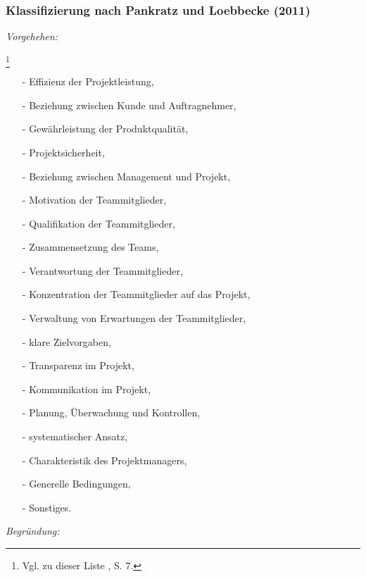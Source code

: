 \noindent
\subsubsection{Klassifizierung nach Pankratz und Loebbecke (2011)}
\textit{Vorgehehen:}\\\noindent

\footnote{Vgl. zu dieser Liste \cite{Pankratz.2011}, S. 7.}
\begin{itemize}\itemsep0pt
\item[-]{Effizienz der Projektleistung,}
\item[-]{Beziehung zwischen Kunde und Auftragnehmer,}
\item[-]{Gewährleistung der Produktqualität,}
\item[-]{Projektsicherheit,}
\item[-]{Beziehung zwischen Management und Projekt,}
\item[-]{Motivation der Teammitglieder,}
\item[-]{Qualifikation der Teammitglieder,}
\item[-]{Zusammensetzung des Teams,}
\item[-]{Verantwortung der Teammitglieder,}
\item[-]{Konzentration der Teammitglieder auf das Projekt,}
\item[-]{Verwaltung von Erwartungen der Teammitglieder,}
\item[-]{klare Zielvorgaben,}
\item[-]{Transparenz im Projekt,}
\item[-]{Kommunikation im Projekt,}
\item[-]{Planung, Überwachung und Kontrollen,}
\item[-]{systematischer Ansatz,}
\item[-]{Charakteristik des Projektmanagers,}
\item[-]{Generelle Bedingungen,}
\item[-]{Sonstiges.}
\end{itemize}
\textit{Begründung:}\\\noindent